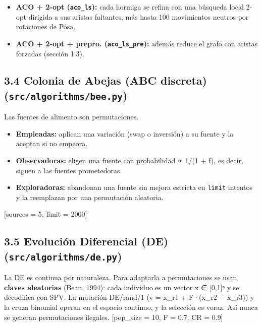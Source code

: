 \documentclass[
  spanish,
  12pt,
]{article}
\providecommand{\tightlist}{%
  \setlength{\itemsep}{0pt}\setlength{\parskip}{0pt}}
\begin{document}
\begin{itemize}
\tightlist
\item
  \textbf{ACO + 2-opt (\texttt{aco\_ls}):} cada hormiga se refina con
  una búsqueda local 2-opt dirigida a sus aristas faltantes, más hasta
  100 movimientos neutros por rotaciones de Pósa.
\item
  \textbf{ACO + 2-opt + prepro. (\texttt{aco\_ls\_pre}):} además reduce
  el grafo con aristas forzadas (sección 1.3).
\end{itemize}

\subsection{\texorpdfstring{3.4 Colonia de Abejas (ABC discreta)
(\texttt{src/algorithms/bee.py})}{3.4 Colonia de Abejas (ABC discreta) (src/algorithms/bee.py)}}\label{colonia-de-abejas-abc-discreta-srcalgorithmsbee.py}

Las fuentes de alimento son permutaciones.

\begin{itemize}
\tightlist
\item
  \textbf{Empleadas:} aplican una variación (swap o inversión) a su
  fuente y la aceptan si no empeora.
\item
  \textbf{Observadoras:} eligen una fuente con probabilidad ∝ 1/(1 + f),
  es decir, siguen a las fuentes prometedoras.
\item
  \textbf{Exploradoras:} abandonan una fuente sin mejora estricta en
  \texttt{limit} intentos y la reemplazan por una permutación aleatoria.
\end{itemize}

{[}sources = 5, limit = 2000{]}

\subsection{\texorpdfstring{3.5 Evolución Diferencial (DE)
(\texttt{src/algorithms/de.py})}{3.5 Evolución Diferencial (DE) (src/algorithms/de.py)}}\label{evoluciuxf3n-diferencial-de-srcalgorithmsde.py}

La DE es continua por naturaleza. Para adaptarla a permutaciones se usan
\textbf{claves aleatorias} (Bean, 1994): cada individuo es un vector x ∈
{[}0,1{]}ⁿ y se decodifica con SPV. La mutación DE/rand/1 (v = x\_r1 +
F·(x\_r2 − x\_r3)) y la cruza binomial operan en el espacio continuo, y
la selección es voraz. Así nunca se generan permutaciones ilegales.
{[}pop\_size = 10, F = 0.7, CR = 0.9{]}
\end{document}

